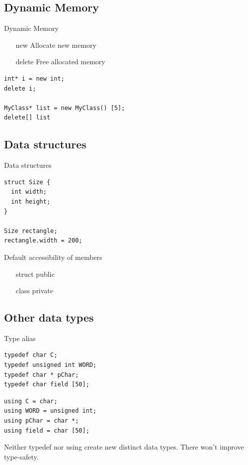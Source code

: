 \documentclass{beamer}
\begin{document}
\subsection{Dynamic Memory}
\begin{frame}[fragile]{Dynamic Memory}
\begin{itemize}
  \item [new] Allocate new memory
  \item [delete] Free allocated memory
\end{itemize}
\begin{lstlisting}
int* i = new int;
delete i;

MyClass* list = new MyClass() [5];
delete[] list
\end{lstlisting}
\end{frame}

\subsection{Data structures}
\begin{frame}[fragile]{Data structures}
\begin{lstlisting}
struct Size {
  int width;
  int height;
}

Size rectangle;
rectangle.width = 200;
\end{lstlisting}
\end{frame}

\begin{frame}{Default accessibility of members}
\begin{itemize}
  \item [struct] public
  \item [class] private
\end{itemize}
\end{frame}

\subsection{Other data types}
\begin{frame}[fragile]{Type alias}
\begin{lstlisting}[caption=type alias with typedef]
typedef char C;
typedef unsigned int WORD;
typedef char * pChar;
typedef char field [50];
\end{lstlisting}

\begin{lstlisting}[caption=type alias with using]
using C = char;
using WORD = unsigned int;
using pChar = char *;
using field = char [50];
\end{lstlisting}

Neither typedef nor using create new distinct data types. There won't improve
type-safety.
\end{frame}
\end{document}
